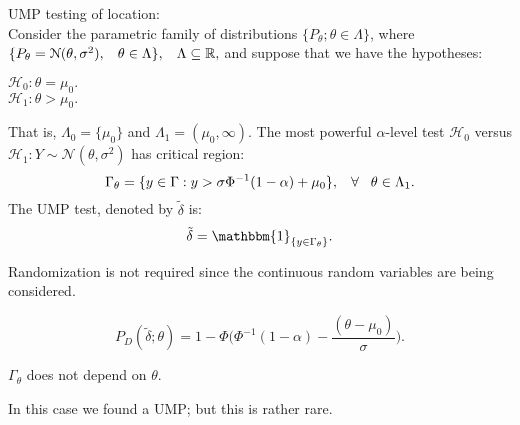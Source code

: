 \documentclass[a4paper,english,12pt]{article}
\begin{document}
\begin{exmp}{UMP testing of location:}\\
Consider the parametric family of distributions $\{P_\theta;\theta \in \Lambda\}$, where\\ $\{P_\theta= \mathcal{N}(\theta,\sigma^2),\hspace{0.3cm}\theta \in \Lambda\}, \hspace{0.3cm} \Lambda \subseteq \mathbb{R},$ and suppose that we have the hypotheses:
\begin{center}
$\mathcal{H}_0 : \theta = \mu_0.$\\
$\mathcal{H}_1 : \theta > \mu_0.$	
\end{center}
	
That is, $\Lambda_0 = \{\mu_0\}$ and $\Lambda_1 = (\mu_0,\infty)$. The most powerful $\alpha$-level test $\mathcal{H}_0$ versus $\mathcal{H}_1 : Y \sim \mathcal{N}(\theta,\sigma^2)$ has critical region:
\begin{equation}
\Gamma_\theta = \{y \in \Gamma: y > \sigma \Phi^{-1}(1 - \alpha) + \mu_0 \}, \hspace{0.3cm} \forall \hspace{0.3cm} \theta \in \Lambda_1.
\end{equation}
The UMP test, denoted by $\tilde{\delta}$ is:
\begin{equation}
\tilde{\delta} = \mathbbm{1}_{\{y \in \Gamma_\theta\}}.
\end{equation}

\begin{rem}
Randomization is not required since the continuous random variables are being considered.	
\end{rem}		
\begin{equation*}
P_D(\tilde{\delta}; \theta) = 1 - \Phi\Big(\Phi^{-1}(1 - \alpha) - \dfrac{(\theta - \mu_0)}{\sigma}\Big).
\end{equation*}

\begin{note}
	$\Gamma_\theta$ does not depend on $\theta$.	
\end{note}	
\begin{note}
	In this case we found a UMP; but this is rather rare.	
\end{note}	
\end{exmp}		 
\end{document}
